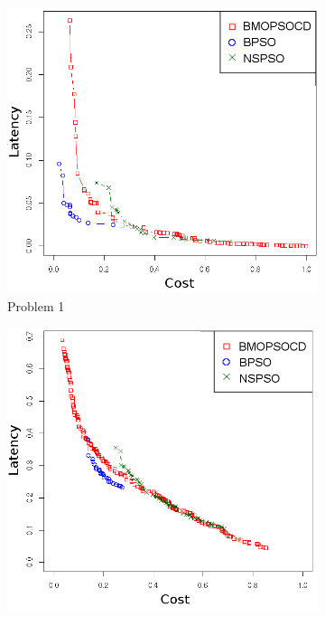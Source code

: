 \begin{figure}[]
   \centering
   \begin{subfigure}{0.30\textwidth}
       \includegraphics[width=\textwidth]{pics/total1.png}
	   \caption{Problem 1}
   \end{subfigure}
   \begin{subfigure}{0.30\textwidth}
       \includegraphics[width=\textwidth]{pics/total2.png}

\end{subfigure}
\end{figure}
